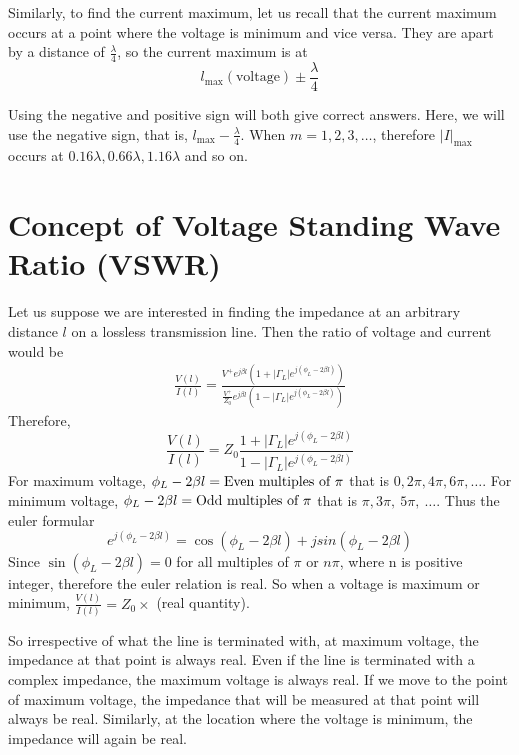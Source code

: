 \begin{exmp}
Similarly, to find the current maximum, let us recall that the current maximum occurs at a point where the voltage is minimum and vice versa. They are apart by a distance of $\frac{\lambda}{4}$, so the current maximum is at
\[
l_\max(\text{voltage})\pm \frac{\lambda}{4}
\]

Using the negative and positive sign will both give correct answers. Here, we will use the negative sign, that is, $l_\max-\frac{\lambda}{4}$. When $m = 1, 2, 3, \ldots$, therefore $|I|_\max$ occurs at $0.16\lambda , 0.66\lambda , 1.16\lambda$ and so on.
\end{exmp}

\section{Concept of Voltage Standing Wave Ratio (VSWR)}
Let us suppose we are interested in finding the impedance at an arbitrary distance $l$ on a lossless transmission line. Then the ratio of voltage and current would be
\begin{align*}
\frac{V(l)}{I(l)} = \frac{V^{+}e^{j\beta l}(1+ |\Gamma_L|e^{j(\phi_L- 2 \beta l)})}{\frac{V^{+}}{Z_0}e^{j\beta l}(1- |\Gamma_L|e^{j(\phi_L- 2\beta l)})}
\end{align*}
Therefore,
\begin{equation*}
\frac{V(l)}{I(l)} = Z_0 \frac{1+ |\Gamma_L|e^{j(\phi_L- 2 \beta l)}}{1- |\Gamma_L|e^{j(\phi_L- 2\beta l)}}
\end{equation*}
For maximum voltage, $\phi_L-2\beta l = \textnormal{Even multiples of }\pi$ that is $0, 2\pi, 4\pi, 6\pi,\ldots$. For minimum voltage, $\phi_L-2\beta l=\textnormal{Odd multiples of } \pi$ that is $\pi, 3\pi,\ 5\pi,\ \ldots$. Thus the euler formular 
\[e^{j(\phi_L - 2 \beta l)} = \cos(\phi_L - 2 \beta l) + jsin(\phi_L - 2 \beta l)\]
Since $\sin(\phi_L - 2 \beta l) = 0$ for all multiples of $\pi$ or $n\pi$, where n is positive integer, therefore the euler relation is real. So when a voltage is maximum or minimum, $\frac{V(l)}{I(l)} = Z_0 \times$ (real quantity).

So irrespective of what the line is terminated with, at maximum voltage, the impedance at that point is always real. Even if the line is terminated with a complex impedance, the maximum voltage is always real. If we move to the point of maximum voltage, the impedance that will be measured at that point will always be real. Similarly, at the location where the voltage is minimum, the impedance will again be real.

